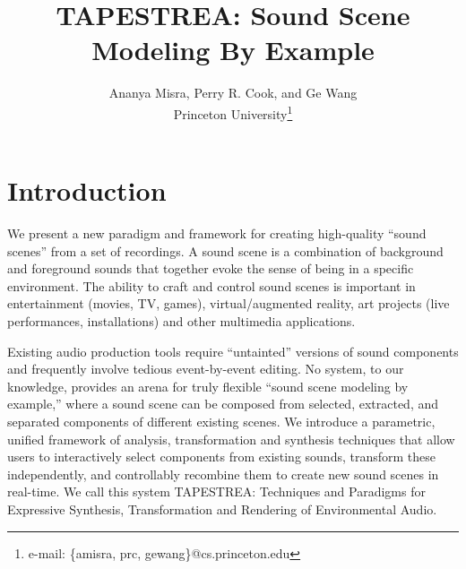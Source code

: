 \documentclass{acmsiggraph}               %
\title{TAPESTREA: Sound Scene Modeling By Example}
\author{Ananya Misra, Perry R. Cook, and Ge Wang\\Princeton 
University\thanks{e-mail: \{amisra, prc, gewang\}@cs.princeton.edu}}
\begin{document}


\maketitle

\section{Introduction}

We present a new paradigm and framework for creating high-quality ``sound
scenes'' from a set of recordings. A sound scene is a
combination of background and foreground sounds that together evoke the
sense of being in a specific environment. The ability to craft and control
sound scenes is important in entertainment (movies, TV, games), 
virtual/augmented reality, art projects (live performances, installations) 
and other multimedia applications.

Existing audio production tools require ``untainted'' versions of 
sound components and frequently involve tedious event-by-event editing.
No system, to our knowledge, provides an arena for truly flexible
``sound scene modeling by example,'' where a sound scene can be composed
from selected, extracted, and separated components of different existing 
scenes. We introduce a parametric, unified framework of analysis, 
transformation and synthesis techniques that allow users to interactively 
select components from existing sounds, transform these independently, 
and controllably recombine them to create new sound scenes in real-time. 
We call this system TAPESTREA: Techniques and Paradigms for Expressive 
Synthesis, Transformation and Rendering of Environmental Audio.
\end{document}
